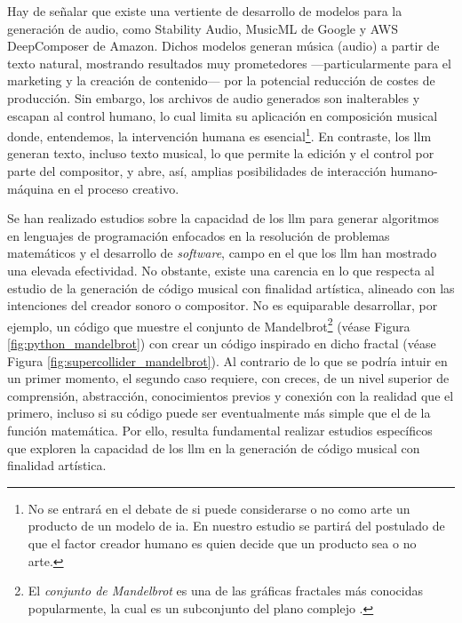 Hay de señalar que existe una vertiente de desarrollo de modelos para la generación de audio, como {Stability Audio}, {MusicML} de Google y {AWS DeepComposer} de Amazon. Dichos modelos generan música (audio) a partir de texto natural, mostrando resultados muy prometedores ---particularmente para el marketing y la creación de contenido--- por la potencial reducción de costes de producción. Sin embargo, los archivos de audio generados son inalterables y escapan al control humano, lo cual limita su aplicación en composición musical donde, entendemos, la intervención humana es esencial\footnote{No se entrará en el debate de si puede considerarse o no como arte un producto de un modelo de \gls{ia}. En nuestro estudio se partirá del postulado de que el factor creador humano es quien decide que un producto sea o no arte.}. En contraste, los \gls{llm} generan texto, incluso texto musical, lo que permite la edición y el control por parte del compositor, y abre, así, amplias posibilidades de interacción humano-máquina en el proceso creativo.

Se han realizado estudios sobre la capacidad de los \gls{llm} para generar algoritmos en lenguajes de programación enfocados en la resolución de problemas matemáticos y el desarrollo de \emph{software}, campo en el que los \gls{llm} han mostrado una elevada efectividad. No obstante, existe una carencia en lo que respecta al estudio de la generación de código musical con finalidad artística, alineado con las intenciones del creador sonoro o compositor. No es equiparable desarrollar, por ejemplo, un código que muestre el conjunto de Mandelbrot\footnote{El \emph{conjunto de Mandelbrot} es una de las gráficas fractales más conocidas popularmente, la cual es un subconjunto del plano complejo \citep{ConjuntoMandelbrot2024}.} (véase Figura \ref{fig:python_mandelbrot}) con crear un código inspirado en dicho fractal (véase Figura \ref{fig:supercollider_mandelbrot}). Al contrario de lo que se podría intuir en un primer momento, el segundo caso requiere, con creces, de un nivel superior de comprensión, abstracción, conocimientos previos y conexión con la realidad que el primero, incluso si su código puede ser eventualmente más simple que el de la función matemática. Por ello, resulta fundamental realizar estudios específicos que exploren la capacidad de los \gls{llm} en la generación de código musical con finalidad artística.

